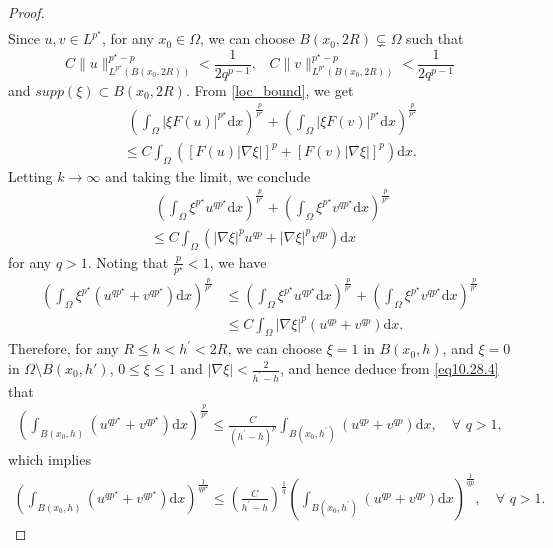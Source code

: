 \documentclass[12pt]{amsart}
\theoremstyle{definition}
\theoremstyle{remark}
\theoremstyle{conclusion}
\theoremstyle{conjecture}
\numberwithin{equation}{section}
\begin{document}
\begin{proof}
\begin{align}
\end{align}
Since $u, v\in L^{p^{\star}}$, for any $x_0\in\Omega$, we can choose $B(x_0,2R)\subsetneq\Omega$ such that
$$C\|u\|_{L^{p^{\star}}(B(x_0,2R))}^{p^{\star}-p}<\frac{1}{2q^{p-1}}, \,\,\,\,\, C\|v\|_{L^{p^{\star}}(B(x_0,2R))}^{p^{\star}-p} <\frac{1}{2q^{p-1}}$$
and $supp(\xi) \subset B(x_0, 2R)$. From \eqref{loc_bound}, we get
\begin{align}\label{eq10.28.4-}
& \quad \left( \int_{\Omega} |\xi F(u)|^{p^{\star}}\mathrm{d}x  \right)^\frac{p}{p^{\star}} +\left( \int_{\Omega} |\xi F(v)|^{p^{\star}}\mathrm{d}x  \right)^\frac{p}{p^{\star}}\\
 &\ \ \ \leq C \int_{\Omega} \left( [F(u) |\nabla \xi|]^p + [F(v) |\nabla \xi|]^p \right)\mathrm{d}x \nonumber.
\end{align}
Letting $k\to\infty$ and taking the limit, we conclude
\begin{align*}
    &\quad \left( \int_{\Omega} \xi^{p^{\star}} u^{qp^{\star}} \mathrm{d}x  \right)^\frac{p}{p^{\star}}+ \left( \int_{\Omega} \xi^{p^{\star}} v^{qp^{\star}} \mathrm{d}x  \right)^\frac{p}{p^{\star}}\\
    &\ \ \ \leq C \int_{\Omega} (|\nabla \xi|^p u^{qp} + |\nabla \xi|^p v^{qp})\mathrm{d}x
\end{align*}
for any $q>1$.  %
Noting that $\frac{p}{p^{\star}}<1$, we have
\begin{align}\label{eq10.28.4}
\left( \int_{\Omega} \xi^{p^{\star}}( u^{qp^{\star}} +v^{qp^{\star}} )\mathrm{d}x  \right)^\frac{p}{p^{\star}} &\leq \left( \int_{\Omega} \xi^{p^{\star}} u^{qp^{\star}} \mathrm{d}x  \right)^\frac{p}{p^{\star}}+ \left( \int_{\Omega} \xi^{p^{\star}} v^{qp^{\star}} \mathrm{d}x  \right)^\frac{p}{p^{\star}}\\
& \leq C \int_{\Omega} |\nabla \xi|^p (u^{qp} +v^{qp})\mathrm{d}x.\nonumber
\end{align}
Therefore, for any $R \leq h < h^\prime < 2R$, we can choose $\xi=1$ in $B(x_0,h)$, and $\xi=0$ in $\Omega\setminus B(x_0,h')$, $0\leq \xi \leq 1$ and $|\nabla\xi|<\frac{2}{h^\prime-h}$, and hence deduce from \eqref{eq10.28.4} that
\begin{align*}
\left( \int_{B(x_0,h)} (u^{qp^{\star}} +v^{qp^{\star}}) \mathrm{d}x  \right)^\frac{p}{p^{\star}}
\leq  \frac{C}{(h^\prime-h)^p} \int_{B(x_0,h^\prime)} (u^{qp}+ v^{qp})\mathrm{d}x,\,\,\,\,\,\,\forall \,\,q>1,
\end{align*}
which implies
\begin{align}\label{eq10.28.5}
\left( \int_{B(x_0,h)} (u^{qp^{\star}} +v^{qp^{\star}}) \mathrm{d}x  \right)^\frac{1}{qp^{\star}}
\leq  \left( \frac{C}{h^\prime-h} \right)^\frac{1}{q} \left( \int_{B(x_0,h^\prime)} (u^{qp}+ v^{qp}) \mathrm{d}x  \right)^\frac{1}{qp},\,\,\,\,\,\,\forall \,\,q>1.
\end{align}


\end{proof}
\end{document}
